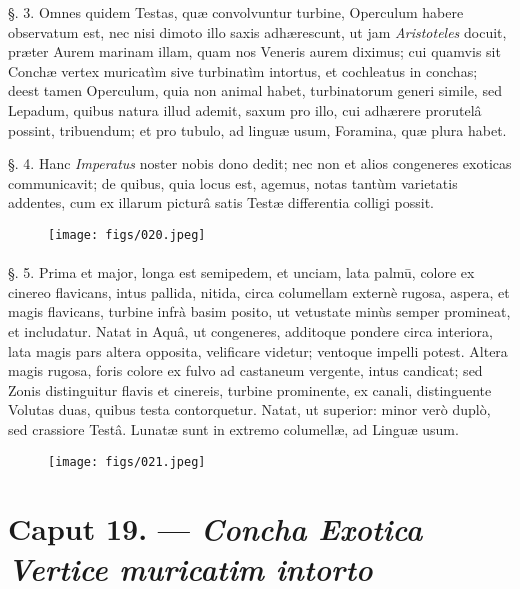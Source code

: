 \documentclass[a4paper, 11pt, oneside, polutonikogreek, german]{article}
\begin{document}
§. 3. Omnes quidem Testas, quæ convolvuntur turbine, Operculum habere observatum est, nec nisi dimoto illo saxis adhærescunt, ut jam \emph{Aristoteles} docuit, præter Aurem marinam illam, quam nos Veneris aurem diximus; cui quamvis sit Conchæ vertex muricatìm sive turbinatìm intortus, et cochleatus in conchas; deest tamen Operculum, quia non animal habet, turbinatorum generi simile, sed Lepadum, quibus natura illud ademit, saxum pro illo, cui adhærere prorutelâ possint, tribuendum; et pro tubulo, ad linguæ usum, Foramina, quæ plura habet.

§. 4. Hanc \emph{Imperatus} noster nobis dono dedit; nec non et alios congeneres exoticas communicavit; de quibus, quia locus est, agemus, notas tantùm varietatis addentes, cum ex illarum picturâ satis Testæ differentia colligi possit.

\begin{figure}[H]
\centering
\texttt{[image: figs/020.jpeg]}

\end{figure}
\paragraph{}
§. 5. Prima et major, longa est semipedem, et unciam, lata palmū, colore ex cinereo flavicans, intus pallida, nitida, circa columellam externè rugosa, aspera, et magis flavicans, turbine infrà basim posito, ut vetustate minùs semper promineat, et includatur. Natat in Aquâ, ut congeneres, additoque pondere circa interiora, lata magis pars altera opposita, velificare videtur; ventoque impelli potest. Altera magis rugosa, foris colore ex fulvo ad castaneum vergente, intus candicat; sed Zonis distinguitur flavis et cinereis, turbine prominente, ex canali, distinguente Volutas duas, quibus testa contorquetur. Natat, ut superior: minor verò duplò, sed crassiore Testâ. Lunatæ sunt in extremo columellæ, ad Linguæ usum.

\begin{figure}[H]
\centering
\texttt{[image: figs/021.jpeg]}

\end{figure}
\paragraph{}
\section{Caput 19. --- \emph{Concha Exotica Vertice muricatim intorto}}
\end{document}
